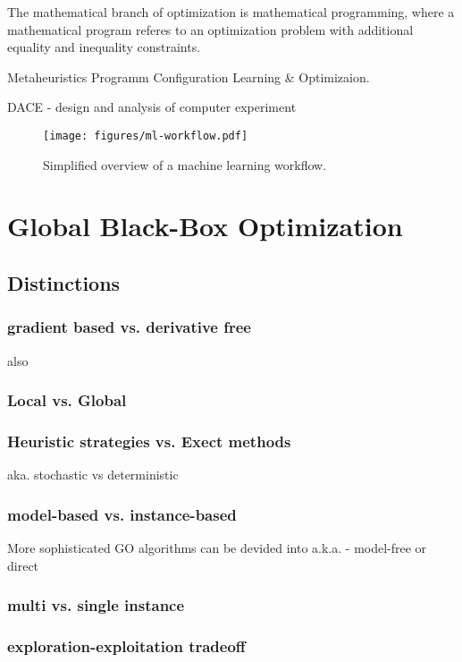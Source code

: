 \documentclass[english]{article}
\begin{document}
The mathematical branch of optimization is mathematical programming, where a mathematical program referes to an optimization problem with additional equality and inequality constraints.

Metaheuristics
Programm Configuration
Learning \& Optimizaion.

DACE - design and analysis of computer experiment

\begin{figure}
  \texttt{[image: figures/ml-workflow.pdf]}
  \caption{Simplified overview of a machine learning workflow.}
  \label{ml-workflow}
\end{figure}



\section{Global Black-Box Optimization}


\subsection{Distinctions}

\subsubsection*{gradient based vs. derivative free}
also

\subsubsection*{Local vs. Global}

\subsubsection*{Heuristic strategies vs. Exect methods}
aka. stochastic vs deterministic

\subsubsection*{model-based vs. instance-based}
More sophisticated \ac{GO} algorithms can be devided into
a.k.a. - model-free or direct

\subsubsection*{multi vs. single instance}

\subsubsection*{exploration-exploitation tradeoff}
\end{document}
